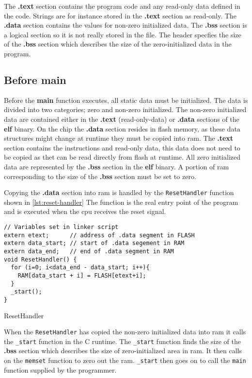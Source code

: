 The \textbf{.text} section contains the program code and any read-only data defined in the code.
Strings are for instance stored in the \textbf{.text} section as read-only.
The \textbf{.data} section contains the values for non-zero initialized data.
The \textbf{.bss} section is a logical section so it is not really stored in the file.
The header specfies the size of the \textbf{.bss} section which describes the size of the zero-initialized data in the program.

\subsection{Before main}

Before the \textbf{main} function executes, all static data must be initialized.
The data is divided into two categories; zero and non-zero initialized.
The non-zero initialized data are contained either in the \textbf{.text} (read-only-data) or \textbf{.data} sections of the \textbf{elf} binary.
On the chip the \textbf{.data} section resides in flash memory, as these data structures might change at runtime they must be copied into \gls{ram}.
The \textbf{.text} section contains the instructions and read-only data, this data does not need to be copied as thet can be read directly from flash at runtime.
All zero initialized data are represented by the \textbf{.bss} section in the \textbf{elf} binary.
A portion of \gls{ram} corresponding to the size of the \textbf{.bss} section must be set to zero.

Copying the \textbf{.data} section into \gls{ram} is handled by the \texttt{ResetHandler} function shown in \autoref{lst:reset-handler}
The function is the real entry point of the program and is executed when the \gls{cpu} receives the reset signal.

\begin{listing}[H]
\begin{verbatim}
// Variables set in linker script
extern etext;      // address of .data segment in FLASH
extern data_start; // start of .data segement in RAM
extern data_end;   // end of .data segment in RAM
void ResetHandler() {
  for (i=0; i<data_end - data_start; i++){
    RAM[data_start + i] = FLASH[etext+i];
  }
  _start();
}
\end{verbatim}
\caption{ResetHandler}
\label{lst:reset-handler}
\end{listing}

When the \texttt{ResetHandler} has copied the non-zero initialized data into \gls{ram} it calls the \texttt{\_start} function in the C runtime.
The \texttt{\_start} function finds the size of the \textbf{.bss} section which describes the size of zero-initialized area in \gls{ram}.
It then calls on the \texttt{memset} function to zero out the \gls{ram}.
\texttt{\_start} then goes on to call the \texttt{main} function supplied by the programmer.

